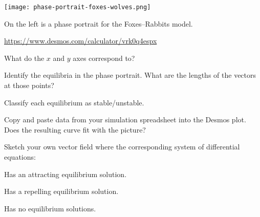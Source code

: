 \documentclass{workbook}
\begin{document}
\begin{slide}

	\question
	
	\begin{center}
		\texttt{[image: phase-portrait-foxes-wolves.png]}
	\end{center}



	On the left is a phase portrait for the Foxes--Rabbits model.

	\url{https://www.desmos.com/calculator/vrk0q4espx}

	\begin{parts}
		\item What do the $x$ and $y$ axes correspond to?
		\item Identify the equilibria in the phase portrait. What are the lengths of the vectors at those points?
		\item Classify each equilibrium as stable/unstable.
		\item Copy and paste data from your simulation spreadsheet into the Desmos plot. Does the resulting
		curve fit with the picture?
	\end{parts}
\end{slide}

\begin{slide}

	\question
	Sketch your own vector field where the corresponding system of differential equations:

	\begin{parts}
		\item Has an attracting equilibrium solution.
		\item Has a repelling equilibrium solution.
		\item Has no equilibrium solutions.
	\end{parts}
\end{slide}
\end{document}
